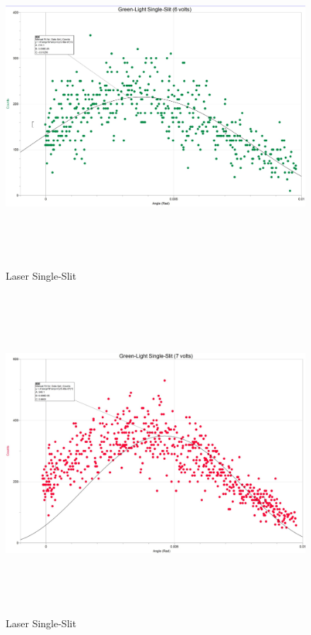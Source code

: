 \documentclass[fleqn]{article}
\begin{document}
  \pagebreak

  \begin{figure}[h!]
    \includegraphics[height=12cm, width=18cm]{Fig4A.JPG}
    \caption{
      Laser Single-Slit
    }
  \end{figure}

  \pagebreak

  \begin{figure}[h!]
    \includegraphics[height=12cm, width=18cm]{Fig4B.JPG}
    \caption{
      Laser Single-Slit
    }
  \end{figure}
\end{document}
